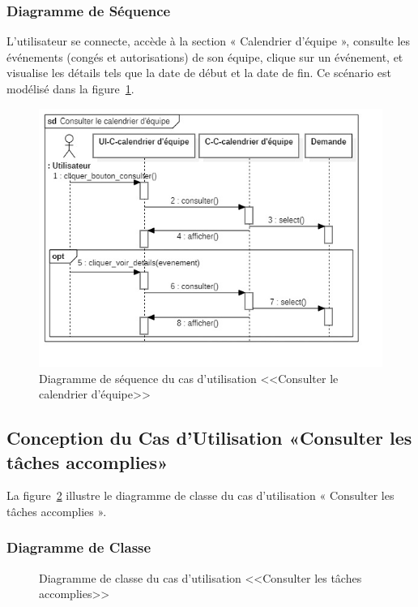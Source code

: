 \subsubsection{Diagramme de Séquence}
L’utilisateur se connecte, accède à la section « Calendrier d’équipe », consulte les événements (congés et autorisations) de son équipe, clique sur un événement, et visualise les détails tels que la date de début et la date de fin. Ce scénario est modélisé dans la figure~\ref{fig:seq_manage_calendar_equip}.
\begin{figure}[h]
    \centering
    \includegraphics[width=13cm]{images/S_caleq.jpg}
    \caption{Diagramme de séquence du cas d'utilisation <<Consulter le calendrier d’équipe>>}
    \label{fig:seq_manage_calendar_equip}
\end{figure}
\newpage
\subsection{Conception du Cas d'Utilisation «Consulter les tâches accomplies»}
La figure~\ref{fig:class_completed_tasks} illustre le diagramme de classe du cas d’utilisation « Consulter les tâches accomplies ».
\subsubsection{Diagramme de Classe}
\begin{figure}[h]
     \centering
     \caption{Diagramme de classe du cas d'utilisation <<Consulter les tâches accomplies>>}
     \label{fig:class_completed_tasks}
\end{figure}
